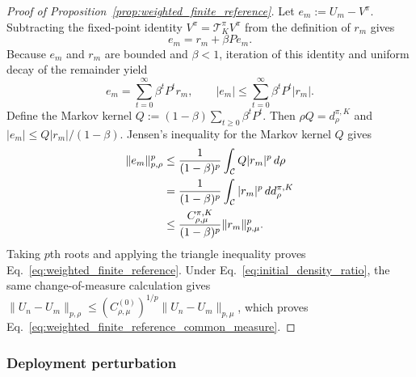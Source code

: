 \documentclass{article}
\theoremstyle{plain}
\theoremstyle{definition}
\theoremstyle{remark}
\begin{document}
\begin{proof}[Proof of Proposition~\ref{prop:weighted_finite_reference}]
Let $e_m:=U_m-V^\pi$. Subtracting the fixed-point identity
$V^\pi=\mathcal T_K^\pi V^\pi$ from the definition of $r_m$ gives
\begin{equation}
e_m=r_m+\beta Pe_m.
\label{eq:weighted_resolvent_identity}
\end{equation}
Because $e_m$ and $r_m$ are bounded and $\beta<1$, iteration of this identity
and uniform decay of the remainder yield
\begin{equation}
e_m=\sum_{t=0}^{\infty}\beta^tP^tr_m,
\qquad
|e_m|\le\sum_{t=0}^{\infty}\beta^tP^t|r_m|.
\label{eq:weighted_resolvent_series}
\end{equation}
Define the Markov kernel
\(
Q:=(1-\beta)\sum_{t\ge0}\beta^tP^t.
\)
Then $\rho Q=d_\rho^{\pi,K}$ and
$|e_m|\le Q|r_m|/(1-\beta)$. Jensen's inequality for the Markov kernel $Q$
gives
\begin{align}
\|e_m\|_{p,\rho}^p
&\le
\frac{1}{(1-\beta)^p}
\int_{\mathcal C}Q|r_m|^p\,d\rho
\notag\\
&=
\frac{1}{(1-\beta)^p}
\int_{\mathcal C}|r_m|^p\,d d_\rho^{\pi,K}
\notag\\
&\le
\frac{C_{\rho,\mu}^{\pi,K}}{(1-\beta)^p}
\|r_m\|_{p,\mu}^p.
\label{eq:weighted_residual_step}
\end{align}
Taking $p$th roots and applying the triangle inequality proves
Eq.~\eqref{eq:weighted_finite_reference}. Under
Eq.~\eqref{eq:initial_density_ratio}, the same change-of-measure calculation
gives
$\|U_n-U_m\|_{p,\rho}\le
(C_{\rho,\mu}^{(0)})^{1/p}\|U_n-U_m\|_{p,\mu}$,
which proves Eq.~\eqref{eq:weighted_finite_reference_common_measure}.
\end{proof}

\subsubsection{Deployment perturbation}
\label{app:proof_deployment}
\end{document}

